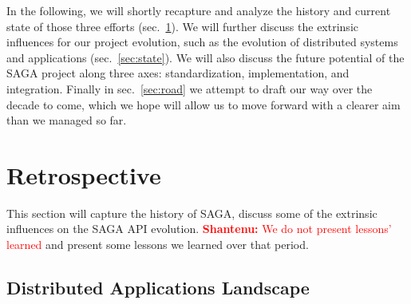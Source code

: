 \documentclass{article}
\newcommand{\B}[1]{\textbf{#1}}
\newcommand{\smilie}{\small;-)~\xspace}
\newcommand{\jhanote}[1]{{\textcolor{red}{     \B{Shantenu:} #1 }}}
\newcommand{\jhanote}[1]{}
\begin{document}

In the following, we will shortly recapture and analyze the history
and current state of those three efforts (sec.~\ref{sec:retro}).  We
will further discuss the extrinsic influences for our project
evolution, such as the evolution of distributed systems and
applications (sec.~\ref{sec:state}).  We will also discuss the future
potential of the SAGA project along three axes: standardization,
implementation, and integration.  Finally in sec.~\ref{sec:road} we
attempt to draft our way over the decade to come, which we hope will
allow us to move forward with a clearer aim than we managed so far.



\section{Retrospective}
\label{sec:retro}

This section will capture the history of SAGA, discuss some of the
extrinsic influences on the SAGA API evolution.  \jhanote{We do not
  present lessons' learned} and present some lessons we learned over
that period.  



\subsection{Distributed Applications Landscape}
\end{document}
